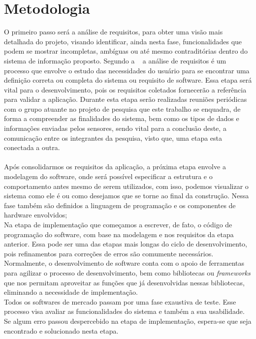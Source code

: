 \documentclass[tcc-proposta]{texufpel}
\begin{document}
\chapter{Metodologia}
O primeiro passo será a análise de requisitos, para obter uma visão mais detalhada do projeto, visando identificar, ainda nesta fase, funcionalidades que podem se mostrar incompletas, ambíguas ou até mesmo contraditórias dentro do sistema de informação proposto. Segundo a ~\citet{IEEE:1990} a análise de requisitos é um processo que envolve o estudo das necessidades do usuário para se encontrar uma definição correta ou completa do sistema ou requisito de software. Essa etapa será vital para o desenvolvimento, pois os requisitos coletados fornecerão a referência para validar a aplicação. Durante esta etapa serão realizadas reuniões periódicas com o grupo atuante no projeto de pesquisa que este trabalho se enquadra, de forma a compreender as finalidades do sistema, bem como os tipos de dados e informações enviadas pelos sensores, sendo vital para a conclusão deste, a comunicação entre os integrantes da pesquisa, visto que, uma etapa esta conectada a outra.
\\


\\

Após consolidarmos os requisitos da aplicação, a próxima etapa envolve a modelagem do software, onde será possível especificar a estrutura e o comportamento antes mesmo de serem utilizados, com isso, podemos visualizar o sistema como ele é ou como desejamos que se torne ao final da construção. Nessa fase também são definidos a linguagem de programação e os componentes de hardware envolvidos;
\\

Na etapa de implementação que começamos a escrever, de fato, o código de programação do software, com base na modelagem e nos requisitos da etapa anterior. Essa pode ser uma das etapas mais longas do ciclo de desenvolvimento, pois refinamentos para correções de erros são comumente necessários. Normalmente, o desenvolvimento de software conta com o apoio de ferramentas para agilizar o processo de desenvolvimento, bem como bibliotecas ou \textit{frameworks} que nos permitam aproveitar as funções que já desenvolvidas nessas bibliotecas, eliminando a necessidade de implementação.
\\

Todos os softwares de mercado passam por uma fase exaustiva de teste. Esse processo visa avaliar as funcionalidades do sistema e também a sua usabilidade. Se algum erro passou despercebido na etapa de implementação, espera-se que seja encontrado e solucionado nesta etapa.
\\
\end{document}
